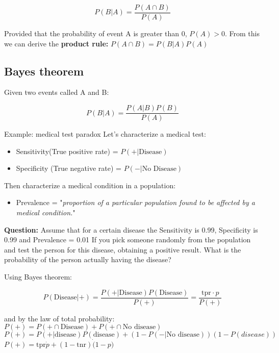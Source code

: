 \begin{equation}
    P(B|A) = \frac{P(A \cap B)} {P(A)} 
\end{equation}

Provided that the probability of event A is greater than 0, $P(A) > 0$.
From this we can derive the \textbf{product rule:} $P(A \cap B) = P(B|A)P(A)$


\subsection{Bayes theorem}
Given two events called A and B:

\begin{equation}
    P(B|A) = \frac{P(A|B)P(B)} {P(A)} 
\end{equation}

\begin{example}{Example: medical test paradox}
    Let's characterize a medical test:
    \begin{itemize}
        \item Sensitivity(True positive rate) = $P(+ | \text{Disease})$
        \item Specificity (True negative rate) = $P(- | \text{No Disease})$
    \end{itemize}
    Then characterize a medical condition in a population:
    \begin{itemize}
        \item Prevalence = "\emph{proportion of a particular population found to be affected by a medical condition.}"
    \end{itemize} 
    \vspace{1em}
    \textbf{Question:} Assume that for a certain disease the Sensitivity is 0.99, Specificity is 0.99 and Prevalence = 0.01
    If you pick someone randomly from the population and test the person for this disease, obtaining a positive
    result. What is the probability of the person actually having the disease?
    \vspace{2em}
    
    Using Bayes theorem:

    \begin{equation}
        P(\text{Disease}|+) = \frac{P(+|\text{Disease})P(\text{Disease})} {P(+)} = \frac{\text{tpr} \cdot p} {P(+)}  
    \end{equation}

    and by the law of total probability: \\
    $P(+) = P(+ \cap \text{Disease}) + P(+ \cap \text{No disease})$ \\
    $P(+) = P(+|\text{disease})P(\text{disease}) + (1-P(-|\text{No disease}))(1-P(disease))$ \\
    $P(+) = \text{tpr} \dot p + (1 - \text{tnr})\dot (1-p)$ \\


\end{example}
